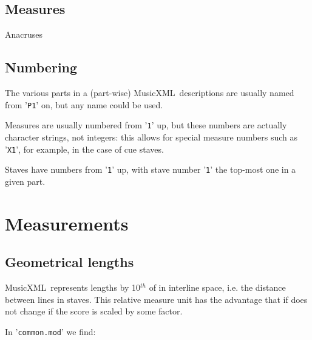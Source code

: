 \documentclass[12pt,a4paper]{article}
\newcommand{\mxml}{MusicXML}
\begin{document}
 

\subsection{Measures}

Anacruses 

\subsection{Numbering}

The various parts in a (part-wise) \mxml\ descriptions are usually named from '{\tt P1}' on, but any name could be used.

Measures are usually numbered from {'\tt 1}' up, but these numbers are actually character strings, not integers: this allows for special measure numbers such as {'\tt X1}', for example, in the case of cue staves.

Staves have numbers from {'\tt 1}' up, with stave number {'\tt 1}' the top-most one in a given part.

\section{Measurements}

\subsection{Geometrical lengths}

\mxml\ represents lengths by 10$^{th}$ of in interline space, i.e. the distance between lines in staves. This relative measure unit has the advantage that if does not change if the score is scaled by some factor.

In {'\tt common.mod}' we find:
\end{document}
